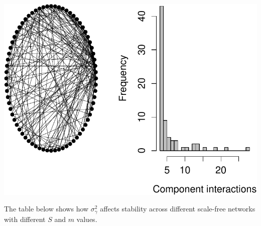 \documentclass[]{article}
\begin{document}
\begin{center}\includegraphics{SI_files/figure-latex/unnamed-chunk-26-1} \end{center}

The table below shows how \(\sigma^{2}_\gamma\) affects stability across
different scale-free networks with different \(S\) and \(m\) values.
\end{document}
